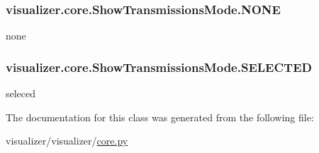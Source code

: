 \subsubsection[{\texorpdfstring{N\+O\+NE}{NONE}}]{\setlength{\rightskip}{0pt plus 5cm}visualizer.\+core.\+Show\+Transmissions\+Mode.\+N\+O\+NE\hspace{0.3cm}{\ttfamily [static]}}\hypertarget{classvisualizer_1_1core_1_1ShowTransmissionsMode_a45dfbb41095952286a6d450d3370bac6}{}\label{classvisualizer_1_1core_1_1ShowTransmissionsMode_a45dfbb41095952286a6d450d3370bac6}


none 

\subsubsection[{\texorpdfstring{S\+E\+L\+E\+C\+T\+ED}{SELECTED}}]{\setlength{\rightskip}{0pt plus 5cm}visualizer.\+core.\+Show\+Transmissions\+Mode.\+S\+E\+L\+E\+C\+T\+ED\hspace{0.3cm}{\ttfamily [static]}}\hypertarget{classvisualizer_1_1core_1_1ShowTransmissionsMode_ac64d9b2800dc198ba22450c507a0d31c}{}\label{classvisualizer_1_1core_1_1ShowTransmissionsMode_ac64d9b2800dc198ba22450c507a0d31c}


seleced 



The documentation for this class was generated from the following file\+:\begin{DoxyCompactItemize}
\item 
visualizer/visualizer/\hyperlink{visualizer_2visualizer_2core_8py}{core.\+py}\end{DoxyCompactItemize}
